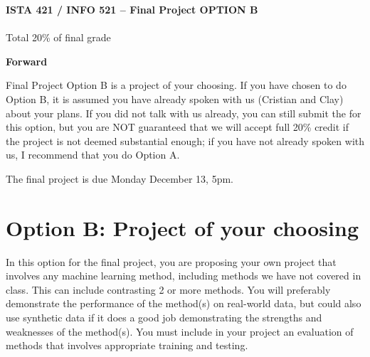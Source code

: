 \documentclass[10pt]{article}
\begin{document}
\begin{center}
    {\Large {\bf ISTA 421 / INFO 521 -- Final Project OPTION B}} \\
     \\
    Total 20\% of final grade \\
    \vspace{1cm}
\end{center}



\vspace{1cm}
{\Large {\bf Forward}}

Final Project Option B is a project of your choosing.  
If you have chosen to do Option B, it is assumed you have already spoken with us (Cristian and Clay) about your plans.
If you did not talk with us already, you can still submit the for this option, but you are NOT guaranteed that we will accept full 20\% credit if the project is not deemed substantial enough; if you have not already spoken with us, I recommend that you do Option A.

The final project is due Monday December 13, 5pm.



\section*{Option B: Project of your choosing}

In this option for the final project, you are proposing your own project that involves any machine learning method, including methods we have not covered in class.  This can include contrasting 2 or more methods.  You will preferably demonstrate the performance of the method(s) on real-world data, but could also use synthetic data if it does a good job demonstrating the strengths and weaknesses of the method(s).  You must include in your project an evaluation of methods that involves appropriate training and testing.  
\end{document}
